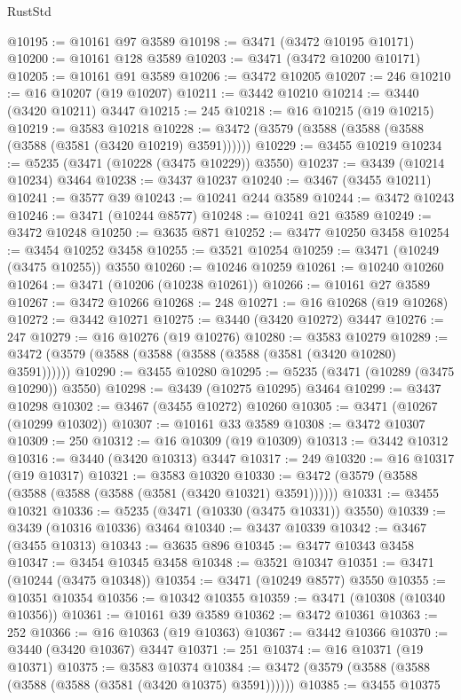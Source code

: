 \begin{lexlean}{RustStd}
\begin{coremodule}
{{{{{{{{{{{{{{{{{{{@10195 := @10161 @97 @3589
@10198 := @3471 (@3472 @10195 @10171)
@10200 := @10161 @128 @3589
@10203 := @3471 (@3472 @10200 @10171)
@10205 := @10161 @91 @3589
@10206 := @3472 @10205
@10207 := 246
@10210 := @16 @10207 (@19 @10207)
@10211 := @3442 @10210
@10214 := @3440 (@3420 @10211) @3447
@10215 := 245
@10218 := @16 @10215 (@19 @10215)
@10219 := @3583 @10218
@10228 := @3472 (@3579 (@3588 (@3588 (@3588 (@3588 (@3581 (@3420 @10219) @3591))))))
@10229 := @3455 @10219
@10234 := @5235 (@3471 (@10228 (@3475 @10229)) @3550)
@10237 := @3439 (@10214 @10234) @3464
@10238 := @3437 @10237
@10240 := @3467 (@3455 @10211)
@10241 := @3577 @39
@10243 := @10241 @244 @3589
@10244 := @3472 @10243
@10246 := @3471 (@10244 @8577)
@10248 := @10241 @21 @3589
@10249 := @3472 @10248
@10250 := @3635 @871
@10252 := @3477 @10250 @3458
@10254 := @3454 @10252 @3458
@10255 := @3521 @10254
@10259 := @3471 (@10249 (@3475 @10255)) @3550
@10260 := @10246 @10259
@10261 := @10240 @10260
@10264 := @3471 (@10206 (@10238 @10261))
@10266 := @10161 @27 @3589
@10267 := @3472 @10266
@10268 := 248
@10271 := @16 @10268 (@19 @10268)
@10272 := @3442 @10271
@10275 := @3440 (@3420 @10272) @3447
@10276 := 247
@10279 := @16 @10276 (@19 @10276)
@10280 := @3583 @10279
@10289 := @3472 (@3579 (@3588 (@3588 (@3588 (@3588 (@3581 (@3420 @10280) @3591))))))
@10290 := @3455 @10280
@10295 := @5235 (@3471 (@10289 (@3475 @10290)) @3550)
@10298 := @3439 (@10275 @10295) @3464
@10299 := @3437 @10298
@10302 := @3467 (@3455 @10272) @10260
@10305 := @3471 (@10267 (@10299 @10302))
@10307 := @10161 @33 @3589
@10308 := @3472 @10307
@10309 := 250
@10312 := @16 @10309 (@19 @10309)
@10313 := @3442 @10312
@10316 := @3440 (@3420 @10313) @3447
@10317 := 249
@10320 := @16 @10317 (@19 @10317)
@10321 := @3583 @10320
@10330 := @3472 (@3579 (@3588 (@3588 (@3588 (@3588 (@3581 (@3420 @10321) @3591))))))
@10331 := @3455 @10321
@10336 := @5235 (@3471 (@10330 (@3475 @10331)) @3550)
@10339 := @3439 (@10316 @10336) @3464
@10340 := @3437 @10339
@10342 := @3467 (@3455 @10313)
@10343 := @3635 @896
@10345 := @3477 @10343 @3458
@10347 := @3454 @10345 @3458
@10348 := @3521 @10347
@10351 := @3471 (@10244 (@3475 @10348))
@10354 := @3471 (@10249 @8577) @3550
@10355 := @10351 @10354
@10356 := @10342 @10355
@10359 := @3471 (@10308 (@10340 @10356))
@10361 := @10161 @39 @3589
@10362 := @3472 @10361
@10363 := 252
@10366 := @16 @10363 (@19 @10363)
@10367 := @3442 @10366
@10370 := @3440 (@3420 @10367) @3447
@10371 := 251
@10374 := @16 @10371 (@19 @10371)
@10375 := @3583 @10374
@10384 := @3472 (@3579 (@3588 (@3588 (@3588 (@3588 (@3581 (@3420 @10375) @3591))))))
@10385 := @3455 @10375
}}}}}}}}}}}}}}}}}}}
\end{coremodule}
\end{lexlean}
